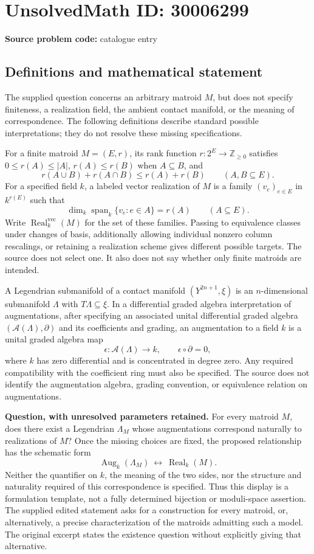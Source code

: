 \documentclass[11pt]{article}
\newcommand{\Z}{\mathbb{Z}}
\begin{document}
\section*{UnsolvedMath ID: 30006299}
\textbf{Source problem code:} catalogue entry
\subsection{Definitions and mathematical statement}
The supplied question concerns an arbitrary matroid \(M\), but does not specify finiteness, a realization field, the ambient contact manifold, or the meaning of correspondence. The following definitions describe standard possible interpretations; they do not resolve these missing specifications.

For a finite matroid \(M=(E,r)\), its rank function \(r:2^E\to\Z_{\geq 0}\) satisfies \(0\leq r(A)\leq |A|\), \(r(A)\leq r(B)\) when \(A\subseteq B\), and
\[
r(A\cup B)+r(A\cap B)\leq r(A)+r(B)
\qquad(A,B\subseteq E).
\]
For a specified field \(k\), a labeled vector realization of \(M\) is a family \((v_e)_{e\in E}\) in \(k^{r(E)}\) such that
\[
\dim_k\operatorname{span}_k\{v_e:e\in A\}=r(A)
\qquad(A\subseteq E).
\]
Write \(\operatorname{Real}^{\mathrm{vec}}_k(M)\) for the set of these families. Passing to equivalence classes under changes of basis, additionally allowing individual nonzero column rescalings, or retaining a realization scheme gives different possible targets. The source does not select one. It also does not say whether only finite matroids are intended.

A Legendrian submanifold of a contact manifold \((Y^{2n+1},\xi)\) is an \(n\)-dimensional submanifold \(\Lambda\) with \(T\Lambda\subseteq\xi\). In a differential graded algebra interpretation of augmentations, after specifying an associated unital differential graded algebra \((\mathcal A(\Lambda),\partial)\) and its coefficients and grading, an augmentation to a field \(k\) is a unital graded algebra map
\[
\epsilon:\mathcal A(\Lambda)\longrightarrow k,
\qquad \epsilon\circ\partial=0,
\]
where \(k\) has zero differential and is concentrated in degree zero. Any required compatibility with the coefficient ring must also be specified. The source does not identify the augmentation algebra, grading convention, or equivalence relation on augmentations.

\textbf{Question, with unresolved parameters retained.} For every matroid \(M\), does there exist a Legendrian \(\Lambda_M\) whose augmentations correspond naturally to realizations of \(M\)? Once the missing choices are fixed, the proposed relationship has the schematic form
\[
\operatorname{Aug}_k(\Lambda_M)\ \longleftrightarrow\ \operatorname{Real}_k(M).
\]
Neither the quantifier on \(k\), the meaning of the two sides, nor the structure and naturality required of this correspondence is specified. Thus this display is a formulation template, not a fully determined bijection or moduli-space assertion. The supplied edited statement asks for a construction for every matroid, or, alternatively, a precise characterization of the matroids admitting such a model. The original excerpt states the existence question without explicitly giving that alternative.
\end{document}
